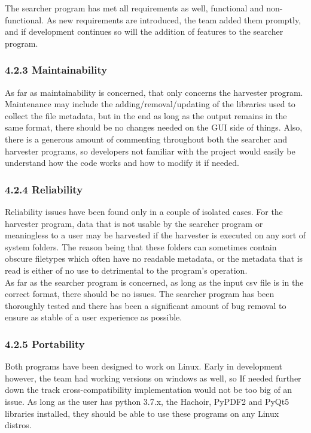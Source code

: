 \documentclass[11pt]{article}
\begin{document}
\begin{adjustwidth}{1cm}{}
The searcher program has met all requirements as well, functional and non-functional. As new requirements are introduced, the team added them promptly, and if development continues so will the addition of features to the searcher program.

\subsubsection{4.2.3 Maintainability}
As far as maintainability is concerned, that only concerns the harvester program. Maintenance may include the adding/removal/updating of the libraries used to collect the file metadata, but in the end as long as the output remains in the same format, there should be no changes needed on the GUI side of things. Also, there is a generous amount of commenting throughout both the searcher and harvester programs, so developers not familiar with the project would easily be understand how the code works and how to modify it if needed.

\subsubsection{4.2.4 Reliability}
Reliability issues have been found only in a couple of isolated cases. For the harvester program, data that is not usable by the searcher program or meaningless to a user may be harvested if the harvester is executed on any sort of system folders. The reason being that these folders can sometimes contain obscure filetypes which often have no readable metadata, or the metadata that is read is either of no use to detrimental to the program’s operation. \\

As far as the searcher program is concerned, as long as the input csv file is in the correct format, there should be no issues. The searcher program has been thoroughly tested and there has been a significant amount of bug removal to ensure as stable of a user experience as possible.

\subsubsection{4.2.5 Portability}
Both programs have been designed to work on Linux. Early in development however, the team had working versions on windows as well, so If needed further down the track cross-compatibility implementation would not be too big of an issue. As long as the user has python 3.7.x, the Hachoir, PyPDF2 and PyQt5 libraries installed, they should be able to use these programs on any Linux distros.


\end{adjustwidth}
\end{document}
